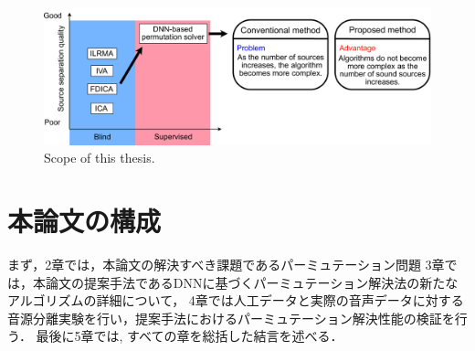 \begin{figure}[t]
    \vspace{4pt}
    \begin{center}
        \includegraphics[width=1.0\columnwidth]{figures/chapter1/scope.pdf}
    \end{center}
    \vspace{-8pt}
	\caption{Scope of this thesis.}
	\label{fig:scope}
\end{figure}


\section{本論文の構成}
まず，2章では，本論文の解決すべき課題であるパーミュテーション問題
3章では，本論文の提案手法であるDNNに基づくパーミュテーション解決法の新たなアルゴリズムの詳細について，
4章では人工データと実際の音声データに対する音源分離実験を行い，提案手法におけるパーミュテーション解決性能の検証を行う．
最後に5章では, すべての章を総括した結言を述べる．


